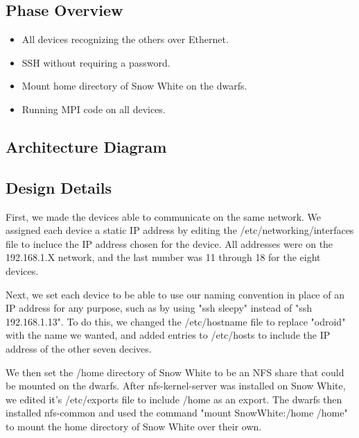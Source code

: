 \subsection{Phase Overview}

\begin{itemize} 
	\item All devices recognizing the others over Ethernet.
	\item SSH without requiring a password.
	\item Mount home directory of Snow White on the dwarfs.
	\item Running MPI code on all devices.
\end{itemize}

\subsection{ Architecture  Diagram}



\subsection{Design Details}
First, we made the devices able to communicate on the same network. We assigned each device a static IP address by editing the /etc/networking/interfaces file to incluce the IP address chosen for the device. All addresses were on the 192.168.1.X network, and the last number was 11 through 18 for the eight devices.

Next, we set each device to be able to use our naming convention in place of an IP address for any purpose, such as by using "ssh sleepy" instead of "ssh 192.168.1.13". To do this, we changed the /etc/hostname file to replace "odroid" with the name we wanted, and added entries to /etc/hosts to include the IP address of the other seven decives. 

We then set the /home directory of Snow White to be an NFS share that could be mounted on the dwarfs. After nfs-kernel-server was installed on Snow White, we edited it's /etc/exports file to include /home as an export. The dwarfs then installed nfs-common and used the command "mount SnowWhite:/home /home" to mount the home directory of Snow White over their own.


